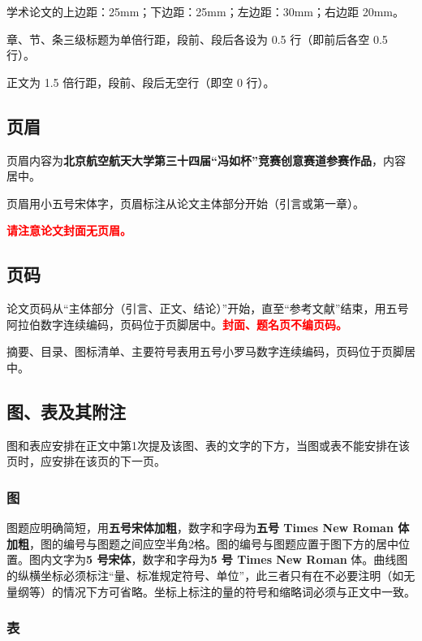 \documentclass{buaa_fengru}
\begin{document}
学术论文的上边距：25mm；下边距：25mm；左边距：30mm；右边距 20mm。

章、节、条三级标题为单倍行距，段前、段后各设为 0.5 行（即前后各空 0.5 行）。

正文为 1.5 倍行距，段前、段后无空行（即空 0 行）。

\subsection{页眉}

页眉内容为\textbf{北京航空航天大学第三十四届“冯如杯”竞赛创意赛道参赛作品}，内容居中。

页眉用小五号宋体字，页眉标注从论文主体部分开始（引言或第一章）。

\textcolor{red}{
    \bfseries
    请注意论文封面无页眉。
}

\subsection{页码}

论文页码从“主体部分（引言、正文、结论）”开始，直至“参考文献”结束，用五号阿拉伯数字连续编码，页码位于页脚居中。\textcolor{red}{\bfseries 封面、题名页不编页码。}

摘要、目录、图标清单、主要符号表用五号小罗马数字连续编码，页码位于页脚居中。

\subsection{图、表及其附注}

图和表应安排在正文中第1次提及该图、表的文字的下方，当图或表不能安排在该页时，应安排在该页的下一页。

\subsubsection{图}

图题应明确简短，用\textbf{五号宋体加粗}，数字和字母为\textbf{五号 Times New Roman 体加粗}，图的编号与图题之间应空半角2格。图的编号与图题应置于图下方的居中位置。图内文字为\textbf{5 号宋体}，数字和字母为\textbf{5 号 Times New Roman} 体。曲线图的纵横坐标必须标注“量、标准规定符号、单位”，此三者只有在不必要注明（如无量纲等）的情况下方可省略。坐标上标注的量的符号和缩略词必须与正文中一致。

\subsubsection{表}
\end{document}
